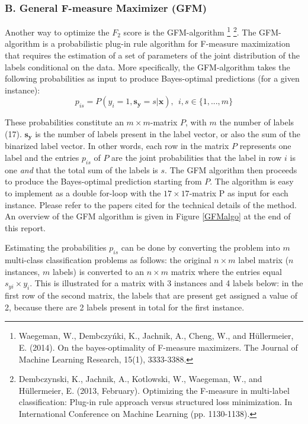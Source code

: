 \documentclass[fleqn]{homework}
\begin{document}
\subsubsection*{B. General F-measure Maximizer (GFM)}
Another way to optimize the $F_2$ score is the GFM-algorithm  \footnote{Waegeman, W., Dembczyńki, K., Jachnik, A., Cheng, W., and Hüllermeier, E. (2014). On the bayes-optimality of F-measure maximizers. The Journal of Machine Learning Research, 15(1), 3333-3388.} \footnote{Dembczynski, K., Jachnik, A., Kotlowski, W., Waegeman, W., and Hüllermeier, E. (2013, February). Optimizing the F-measure in multi-label classification: Plug-in rule approach versus structured loss minimization. In International Conference on Machine Learning (pp. 1130-1138).}. The GFM-algorithm is a probabilistic plug-in rule algorithm for F-measure maximization that requires the estimation of a set of parameters of the joint distribution of the labels conditional on the data. More specifically, the GFM-algorithm takes the following probabilities as input to produce Bayes-optimal predictions (for a given instance):
\begin{equation}\label{GFM}
p_{is} = P(y_i = 1, \mathbf{s_y} = s|\mathbf{x}), \ \ i, s \in \{1,...,m\}
\end{equation}

These probabilities constitute an $m \times m$-matrix $P$, with $m$ the number of labels (17). $\mathbf{s_y}$ is the number of labels present in the label vector, or also the sum of the binarized label vector. In other words, each row in the matrix $P$ represents one label and the entries $p_{is}$ of $P$ are the joint probabilities that the label in row $i$ is one \textit{and} that the total sum of the labels is $s$. The GFM algorithm then proceeds to produce the Bayes-optimal prediction starting from $P$. The algorithm is easy to implement as a double for-loop with the $17 \times 17$-matrix P as input for each instance. Please refer to the papers cited for the technical details of the method. An overview of the GFM algorithm is given in Figure \ref{GFMalgo} at the end of this report. 

Estimating the probabilities $p_{is}$ can be done by converting the problem into $m$ multi-class classification problems as follows: the original $n \times m$ label matrix ($n$ instances, $m$ labels) is converted to an $n \times m$ matrix where the entries equal $s_{yi} \times y_i$. This is illustrated for a matrix with 3 instances and 4 labels below: in the first row of the second matrix, the labels that are present get assigned a value of 2, because there are 2 labels present in total for the first instance. 
\end{document}
